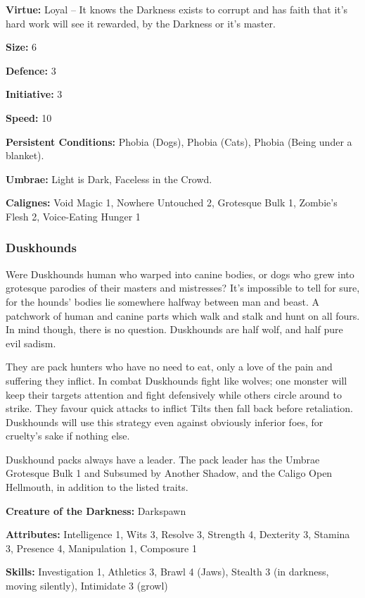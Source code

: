 \noindent \textbf{Virtue:} Loyal – It knows the Darkness exists to corrupt and has faith that it's hard work will see it rewarded, by the Darkness or it's master.

\noindent \textbf{Size:} 6

\noindent \textbf{Defence:} 3

\noindent \textbf{Initiative:} 3

\noindent \textbf{Speed:} 10

\noindent \textbf{Persistent Conditions:} Phobia (Dogs), Phobia (Cats), Phobia (Being under a blanket).

\noindent \textbf{Umbrae:} Light is Dark, Faceless in the Crowd.

\noindent \textbf{Calignes:} Void Magic 1, Nowhere Untouched 2, Grotesque Bulk 1, Zombie's Flesh 2, Voice-Eating Hunger 1

\subsubsection*{Duskhounds}

Were Duskhounds human who warped into canine bodies, or dogs who grew into grotesque parodies of their masters and mistresses? It’s impossible to tell for sure, for the hounds’ bodies lie somewhere halfway between man and beast. A patchwork of human and canine parts which walk and stalk and hunt on all fours. In mind though, there is no question. Duskhounds are half wolf, and half pure evil sadism. 

They are pack hunters who have no need to eat, only a love of the pain and suffering they inflict. In combat Duskhounds fight like wolves; one monster will keep their targets attention and fight defensively while others circle around to strike. They favour quick attacks to inflict Tilts then fall back before retaliation. Duskhounds will use this strategy even against obviously inferior foes, for cruelty’s sake if nothing else.

Duskhound packs always have a leader. The pack leader has the Umbrae Grotesque Bulk 1 and Subsumed by Another Shadow, and the Caligo Open Hellmouth, in addition to the listed traits.

\noindent \textbf{Creature of the Darkness:} Darkspawn

\noindent \textbf{Attributes:} Intelligence 1, Wits 3, Resolve 3, Strength 4, Dexterity 3, Stamina 3, Presence 4, Manipulation 1, Composure 1

\noindent \textbf{Skills:} Investigation 1, Athletics 3, Brawl 4 (Jaws), Stealth 3 (in darkness, moving silently), Intimidate 3 (growl)

